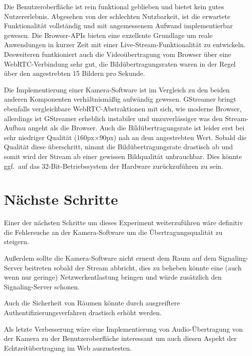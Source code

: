 \documentclass{article}
\begin{document}
\begin{onecolumn}
Die Benutzeroberfläche ist rein funktional geblieben und bietet kein gutes
Nutzererlebnis. Abgesehen von der schlechten Nutzbarkeit, ist die erwartete
Funktionalität vollständig und mit angemessenem Aufwand implementierbar
gewesen. Die Browser-APIs bieten eine exzellente Grundlage um reale
Anwendungen in kurzer Zeit mit einer Live-Stream-Funktionalität zu entwickeln.
Desweiteren funtkioniert auch die Videoübertragung vom Browser über eine
WebRTC-Verbindung sehr gut, die Bildübertragungsraten waren in der
Regel über den angestrebten 15 Bildern pro Sekunde.

Die Implementierung einer Kamera-Software ist im Vergleich zu den beiden
anderen Komponenten verhältnismäßig aufwändig gewesen. GStreamer bringt
ebenfalls vergleichbare WebRTC-Abstraktionen mit sich, wie moderne Browser,
allerdings ist GStreamer erheblich instabiler und unzuverlässiger was den
Stream-Aufbau angeht als die Browser. Auch die Bildübertragungsrate ist leider
erst bei sehr niedriger Qualität (160px$\times$90px) nah an dem angestrebten
Wert. Sobald die Qualität diese überschritt, nimmt die Bildübertragungsrate
drastisch ab und somit wird der Stream ab einer gewissen Bildqualität
unbrauchbar. Dies könnte ggf.\ auf das 32-Bit-Betriebssystem der Hardware
zurückzuführen zu sein.

\section{Nächste Schritte}

Einer der nächsten Schritte um dieses Experiment weiterzuführen wäre definitiv
die Fehlersuche an der Kamera-Software um die Übertragungsqualität zu steigern.

Außerdem sollte die Kamera-Software nicht erneut dem Raum auf dem
Signaling-Server beitreten sobald der Stream abbricht, dies zu beheben könnte
eine (auch wenn nur geringe) Netzwerkentlastung bringen und würde zusätzlich
den Signaling-Server schonen.

Auch die Sicherheit von Räumen könnte durch ausgreiftere
Authentifizierungsverfahren drastisch erhöht werden.

Als letzte Verbesserung wäre eine Implementierung von Audio-Übertragung von der
Kamera zu der Benutzeroberfläche interessant um auch diesen Aspekt der
Echtzeitübertragung im Web auszustesten.


\nocite{*}




\end{onecolumn}
\end{document}
